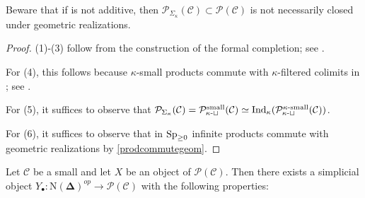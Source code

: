 \documentclass[a4paper,10pt, oneside]{amsart}
\begin{document}
\begin{warning}
	Beware that if \mcc is not additive, then $\mathcal{P}_{\Sigma_\kappa}(\mathcal{C}) \subset \mathcal{P}(\mathcal{C})$ is not necessarily closed under geometric realizations. 
\end{warning}
\begin{proof}
	(1)-(3) follow from the construction of the formal completion; see \cite[Proposition 5.3.6.2]{htt}. 
	
	For (4), this follows because $\kappa$-small products commute with $\kappa$-filtered colimits in \mcs; see \cite[Proposition 5.3.3.3]{htt}.
	
	For (5), it suffices to observe that $\mathcal{P}_{\Sigma_\kappa}(\mathcal{C})=\mathcal{P}^{\mathrm{small}}_{\kappa\text{-}\sqcup}(\mathcal{C})\simeq \mathrm{Ind}_\kappa(\mathcal{P}^{\kappa\text{-}\mathrm{small}}_{\kappa\text{-}\sqcup}(\mathcal{C}))$.
	
	For (6), it suffices to observe that in $\operatorname{Sp}_{\geq0}$ infinite products commute with geometric realizations  by \cref{prodcommutegeom}.
\end{proof}
\begin{lem}
	Let $\mathcal{C}$ be a small \infcat and let $X$ be an object of $\mathcal{P}(\mathcal{C})$. Then there exists a simplicial object $Y_{\bullet}: \mathrm{N}(\boldsymbol{\Delta})^{o p} \rightarrow \mathcal{P}(\mathcal{C})$ with the following properties:
	
\end{lem}
\end{document}
